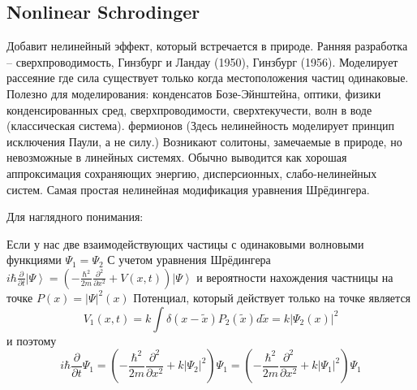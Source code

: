 \documentclass[A4,12pt,oneside]{article}
\renewcommand{\(}{\left(}
\renewcommand{\)}{\right)}
\newcommand{\nprog}{\color{green!50!black}}
\begin{document}
\subsection{Nonlinear Schrodinger}
{ \nprog
Добавит нелинейный эффект, который встречается в природе.
Ранняя разработка -- сверхпроводимость, Гинзбург и Ландау (1950), Гинзбург (1956).
Моделирует рассеяние где сила существует только когда местоположения частиц одинаковые.
Полезно для моделирования: %
конденсатов Бозе-Эйнштейна,
оптики,
физики конденсированных сред,
сверхпроводимости, сверхтекучести,
волн в воде (классическая система).
фермионов (Здесь нелинейность моделирует принцип исключения Паули, а не силу.)
Возникают солитоны, замечаемые в природе, но невозможные в линейных системях.
Обычно выводится как хорошая аппроксимация сохраняющих энергию, дисперсионных, слабо-нелинейных систем.
Самая простая нелинейная модификация уравнения Шрёдингера.


Для наглядного понимания:


Если у нас две взаимодействующих частицы с одинаковыми волновыми функциями%
 $\Psi_1 = \Psi_2$
 С учетом уравнения Шрёдингера 
$i \hbar \frac{\partial}{\partial t}\left|\Psi\right> = \left(-\frac{\hbar^2}{2m}\frac{\partial^2}{\partial x^2} + V\left(x, t\right)\right)\left|\Psi\right>$ 
 и вероятности нахождения частницы на точке %
$P\left(x\right) = \left|\Psi\right|^2\left(x\right) 
$%
Потенциал, который действует только на точке является%
\begin{equation*}
V_1\left(x,t\right) = k \int \delta\left(x-\tilde{x}\right) P_2 \left(\tilde{x}\right) d\tilde{x} =  k \left|\Psi_2\left(x\right)\right|^2
\end{equation*}
и поэтому
\begin{equation*}
i \hbar \frac{\partial}{\partial t}\Psi_1 = \left(-\frac{\hbar^2}{2m}\frac{\partial^2}{\partial x^2} + { k\left|\Psi_2\right|^2}\right)\Psi_1 = \left(-\frac{\hbar^2}{2m}\frac{\partial^2}{\partial x^2} + {k\left|\Psi_1\right|^2}\right)\Psi_1
\end{equation*}}
\end{document}
